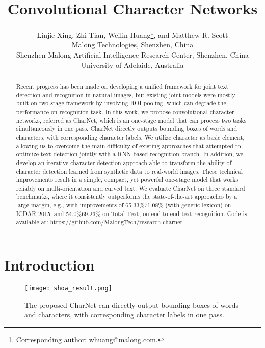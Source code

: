 \documentclass[10pt,twocolumn,letterpaper]{article}
\begin{document}
\title{Convolutional Character Networks}



 \author{Linjie Xing, Zhi Tian, Weilin Huang\thanks{ Corresponding author: whuang@malong.com.}, and Matthew R. Scott\\
Malong Technologies, Shenzhen, China \\
Shenzhen Malong Artificial Intelligence Research Center, Shenzhen, China\\
University of Adelaide, Australia\\
}
\maketitle


\begin{abstract}
Recent progress has been made on developing a unified framework for joint text detection and recognition in natural images, but existing joint models were mostly built on two-stage framework by involving ROI pooling, which can degrade the performance on recognition task.
In this work, we propose convolutional character networks, referred as CharNet, which is an one-stage model that can process two tasks simultaneously in one pass. CharNet directly outputs bounding boxes of words and characters, with corresponding character labels. We utilize character as basic element, allowing us to overcome the main difficulty of existing approaches that attempted to optimize text detection jointly with a RNN-based recognition branch. In addition, we develop an iterative character detection approach able to transform the ability of character detection learned from synthetic data to real-world images.  These technical improvements result in a simple, compact, yet powerful one-stage model that works reliably on multi-orientation and curved text. We evaluate CharNet on three standard benchmarks, where it consistently outperforms the state-of-the-art approaches \cite{lyu2018mask,liu2018fots} by a large margin, e.g., with improvements of 65.33\%71.08\% (with generic lexicon) on ICDAR 2015, and 54.0\%69.23\% on Total-Text, on end-to-end text recognition.
Code is available at: \url{https://github.com/MalongTech/research-charnet}.
\end{abstract}

\section{Introduction}

\begin{figure}[t]
    \begin{center}
        \texttt{[image: show\_result.png]}
    \end{center}
    \vspace{-4mm}
    \caption{The proposed CharNet can directly output bounding boxes of words and characters, with corresponding character labels in one pass.}
    \label{fig:prediction_results}
\end{figure}
\end{document}
